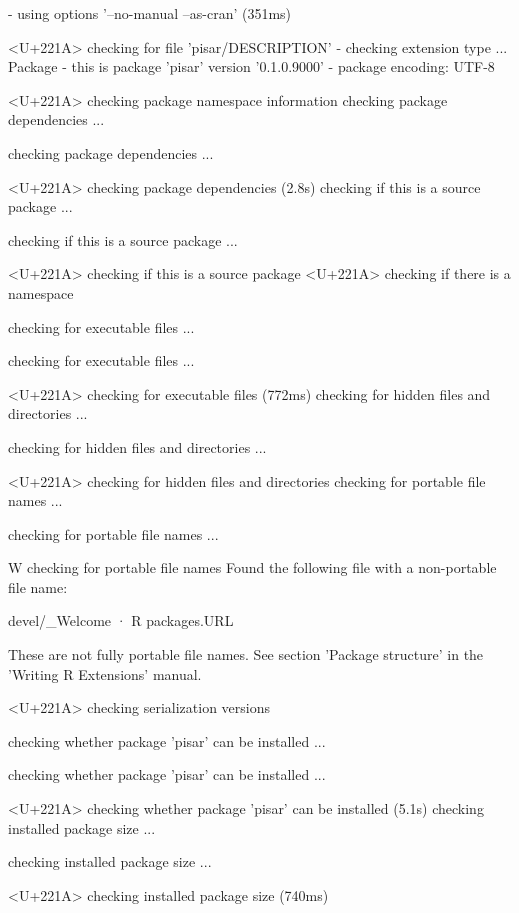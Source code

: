 \documentclass[a4paper,12pt]{article}\usepackage[]{graphicx}\usepackage[]{color}
\begin{document}
\begin{Schunk}
\begin{Soutput}
  
-  using options '--no-manual --as-cran' (351ms)

  
<U+221A>  checking for file 'pisar/DESCRIPTION'
-  checking extension type ... Package
-  this is package 'pisar' version '0.1.0.9000'
-  package encoding: UTF-8

  
<U+221A>  checking package namespace information
   checking package dependencies ...
  
   checking package dependencies ... 
  
<U+221A>  checking package dependencies (2.8s)
   checking if this is a source package ...
  
   checking if this is a source package ... 
  
<U+221A>  checking if this is a source package
<U+221A>  checking if there is a namespace

  
  
  
   checking for executable files ...
  
   checking for executable files ... 
  
<U+221A>  checking for executable files (772ms)
   checking for hidden files and directories ...
  
   checking for hidden files and directories ... 
  
<U+221A>  checking for hidden files and directories
   checking for portable file names ...
  
   checking for portable file names ... 
  
W  checking for portable file names
   Found the following file with a non-portable file name:

  
     devel/_Welcome · R packages.URL

  
   These are not fully portable file names.
   See section 'Package structure' in the 'Writing R Extensions' manual.

  
  
  
<U+221A>  checking serialization versions

  
   checking whether package 'pisar' can be installed ...
  
   checking whether package 'pisar' can be installed ... 
  
<U+221A>  checking whether package 'pisar' can be installed (5.1s)
   checking installed package size ...
  
   checking installed package size ... 
  
<U+221A>  checking installed package size (740ms)

  
  

\end{Soutput}
\end{Schunk}
\end{document}
